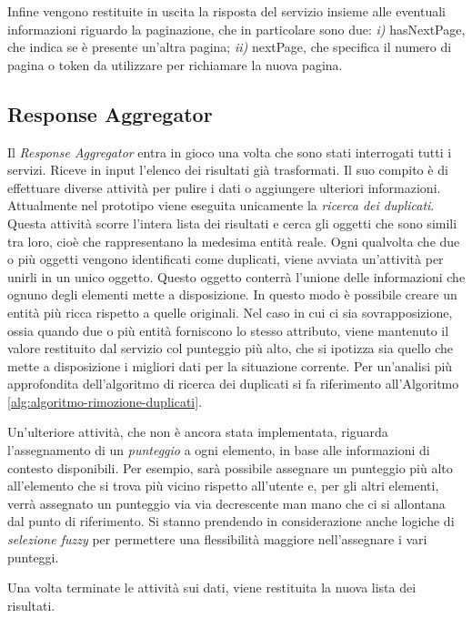 Infine vengono restituite in uscita la risposta del servizio insieme alle eventuali informazioni riguardo la paginazione, che in particolare sono due: \emph{i)} hasNextPage, che indica se è presente un'altra pagina; \emph{ii)} nextPage, che specifica il numero di pagina o token da utilizzare per richiamare la nuova pagina.

\subsection{Response Aggregator\label{sec:response-aggregator}}

Il \emph{Response Aggregator} entra in gioco una volta che sono stati interrogati tutti i servizi. Riceve in input l'elenco dei risultati già trasformati. Il suo compito è di effettuare diverse attività per pulire i dati o aggiungere ulteriori informazioni. Attualmente nel prototipo viene eseguita unicamente la \emph{ricerca dei duplicati}. Questa attività scorre l'intera lista dei risultati e cerca gli oggetti che sono simili tra loro, cioè che rappresentano la medesima entità reale. Ogni qualvolta che due o più oggetti vengono identificati come duplicati, viene avviata un'attività per unirli in un unico oggetto. Questo oggetto conterrà l'unione delle informazioni che ognuno degli elementi mette a disposizione. In questo modo è possibile creare un entità più ricca rispetto a quelle originali. Nel caso in cui ci sia sovrapposizione, ossia quando due o più entità forniscono lo stesso attributo, viene mantenuto il valore restituito dal servizio col punteggio più alto, che si ipotizza sia quello che mette a disposizione i migliori dati per la situazione corrente. Per un'analisi più approfondita dell'algoritmo di ricerca dei duplicati si fa riferimento all'Algoritmo \ref{alg:algoritmo-rimozione-duplicati}.

Un'ulteriore attività, che non è ancora stata implementata, riguarda l'assegnamento di un \emph{punteggio} a ogni elemento, in base alle informazioni di contesto disponibili. Per esempio, sarà possibile assegnare un punteggio più alto all'elemento che si trova più vicino rispetto all'utente e, per gli altri elementi, verrà assegnato un punteggio via via decrescente man mano che ci si allontana dal punto di riferimento. Si stanno prendendo in considerazione anche logiche di \emph{selezione fuzzy} per permettere una flessibilità maggiore nell'assegnare i vari punteggi.

Una volta terminate le attività sui dati, viene restituita la nuova lista dei risultati.


